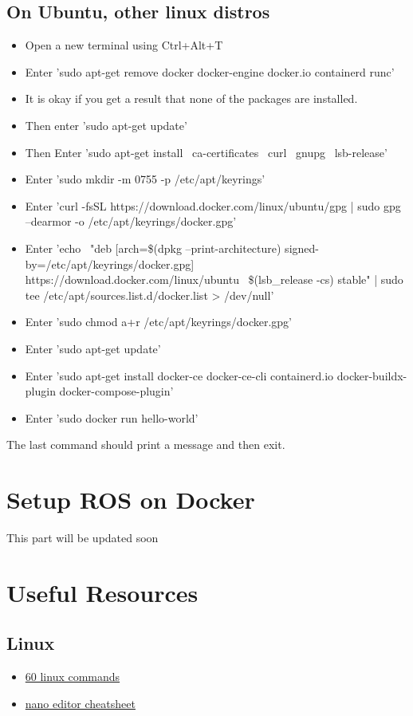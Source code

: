 \documentclass[11pt,fleqn]{book} %
\begin{document}
\section{On Ubuntu, other linux distros}
\begin{itemize}
    \item Open a new terminal using Ctrl+Alt+T
    \item Enter 'sudo apt-get remove docker docker-engine docker.io containerd runc'
    \item It is okay if you get a result that none of the packages are installed.
    \item Then enter 'sudo apt-get update'
    \item Then Enter 
        'sudo apt-get install \
            ca-certificates \
            curl \
            gnupg \
            lsb-release'
    \item Enter 'sudo mkdir -m 0755 -p /etc/apt/keyrings'
    \item Enter 'curl -fsSL https://download.docker.com/linux/ubuntu/gpg | sudo gpg --dearmor -o /etc/apt/keyrings/docker.gpg'
    \item Enter 
        'echo \
        "deb [arch=\$(dpkg --print-architecture) signed-by=/etc/apt/keyrings/docker.gpg] https://download.docker.com/linux/ubuntu \
        \$(lsb\_release -cs) stable" | sudo tee /etc/apt/sources.list.d/docker.list > /dev/null'
    \item Enter 'sudo chmod a+r /etc/apt/keyrings/docker.gpg'
    \item Enter 'sudo apt-get update'
    \item Enter 'sudo apt-get install docker-ce docker-ce-cli containerd.io docker-buildx-plugin docker-compose-plugin'
    \item Enter 'sudo docker run hello-world'
\end{itemize}
The last command should print a message and then exit. 

\chapter{Setup ROS on Docker}
This part will be updated soon

\chapter{Useful Resources}
\section{Linux}
\begin{itemize}
    \item \hyperlink{https://www.youtube.com/watch?v=gd7BXuUQ91w}{60 linux commands}
    \item \hyperlink{https://www.nano-editor.org/dist/latest/cheatsheet.html}{nano editor cheatsheet}
\end{itemize}
\end{document}
